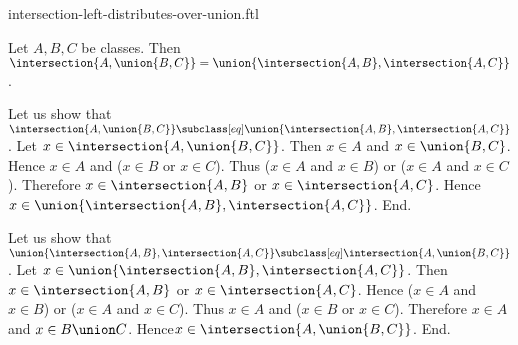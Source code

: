 \documentclass{article}
\begin{document}
\begin{smodule}[creators={Marcel Schütz}]{intersection-left-distributes-over-union.ftl}

  \begin{fproposition*}[label=3102749514268672]
    Let $A, B, C$ be classes.
    Then $\intersection{A,\union{B,C}} = \union{\intersection{A,B},\intersection{A,C}}$.
  \end{fproposition*}
  \begin{fproof}
    Let us show that $\intersection{A,\union{B,C}} \subclass[eq] \union{\intersection{A,B},\intersection{A,C}}$.
      Let $x \in \intersection{A,\union{B,C}}$.
      Then $x \in A$ and $x \in \union{B,C}$.
      Hence $x \in A$ and ($x \in B$ or $x \in C$).
      Thus ($x \in A$ and $x \in B$) or ($x \in A$ and $x \in C$).
      Therefore $x \in \intersection{A,B}$ or $x \in \intersection{A,C}$.
      Hence $x \in \union{\intersection{A,B},\intersection{A,C}}$.
    End.

    Let us show that $\union{\intersection{A,B},\intersection{A,C}} \subclass[eq] \intersection{A,\union{B,C}}$.
      Let $x \in \union{\intersection{A,B},\intersection{A,C}}$.
      Then $x \in \intersection{A,B}$ or $x \in \intersection{A,C}$.
      Hence ($x \in A$ and $x \in B$) or ($x \in A$ and $x \in C$).
      Thus $x \in A$ and ($x \in B$ or $x \in C$).
      Therefore $x \in A$ and $x \in B \union C$.
      Hence$ x \in \intersection{A,\union{B,C}}$.
    End.
  \end{fproof}
\end{smodule}
\end{document}
